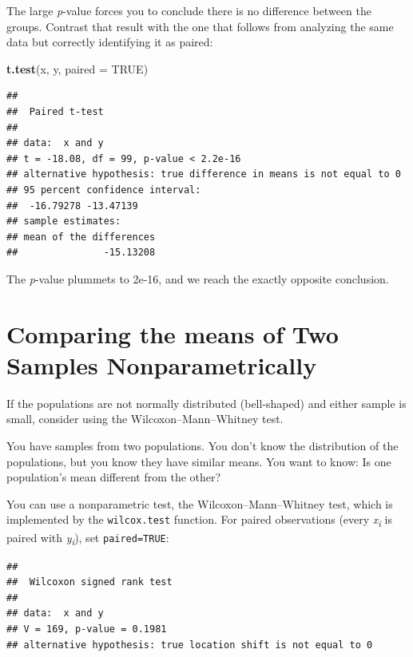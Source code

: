 \documentclass[
]{book}
\newenvironment{Shaded}{\begin{snugshade}}{\end{snugshade}}
\newcommand{\DataTypeTok}[1]{\textcolor[rgb]{0.13,0.29,0.53}{#1}}
\newcommand{\KeywordTok}[1]{\textcolor[rgb]{0.13,0.29,0.53}{\textbf{#1}}}
\newcommand{\NormalTok}[1]{#1}
\newcommand{\OtherTok}[1]{\textcolor[rgb]{0.56,0.35,0.01}{#1}}
\begin{document}
The large \emph{p}-value forces you to conclude there is no difference
between the groups. Contrast that result with the one that follows from
analyzing the same data but correctly identifying it as paired:

\begin{Shaded}
\begin{Highlighting}[]
\KeywordTok{t.test}\NormalTok{(x, y, }\DataTypeTok{paired =} \OtherTok{TRUE}\NormalTok{)}
\end{Highlighting}
\end{Shaded}

\begin{verbatim}
## 
## 	Paired t-test
## 
## data:  x and y
## t = -18.08, df = 99, p-value < 2.2e-16
## alternative hypothesis: true difference in means is not equal to 0
## 95 percent confidence interval:
##  -16.79278 -13.47139
## sample estimates:
## mean of the differences 
##               -15.13208
\end{verbatim}

The \emph{p}-value plummets to 2e-16, and we reach the exactly opposite
conclusion.

\hypertarget{comparing-the-means-of-two-samples-nonparametrically}{%
\section{Comparing the means of Two Samples Nonparametrically}\label{comparing-the-means-of-two-samples-nonparametrically}}

If the populations are not normally distributed (bell-shaped) and either
sample is small, consider using the Wilcoxon--Mann--Whitney test.

You have samples from two populations. You don't know the distribution
of the populations, but you know they have similar means. You want to
know: Is one population's mean different from the other?

You can use a nonparametric test, the Wilcoxon--Mann--Whitney test, which
is implemented by the \texttt{wilcox.test} function. For paired observations
(every \emph{x}\textsubscript{\emph{i}} is paired with \emph{y}\textsubscript{\emph{i}}), set \texttt{paired=TRUE}:

\begin{verbatim}
## 
## 	Wilcoxon signed rank test
## 
## data:  x and y
## V = 169, p-value = 0.1981
## alternative hypothesis: true location shift is not equal to 0
\end{verbatim}
\end{document}
